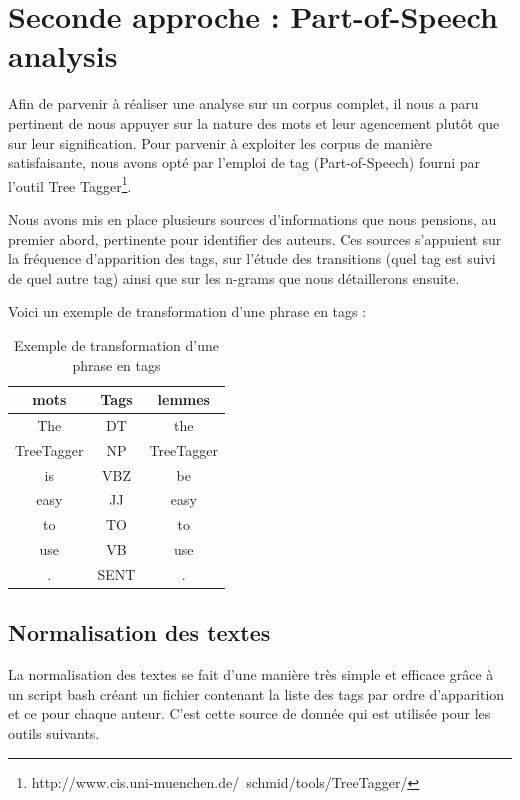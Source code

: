 \documentclass[a4paper,12pt]{report}
\begin{document}
\section{Seconde approche : Part-of-Speech analysis}

Afin de parvenir à réaliser une analyse sur un corpus complet, il nous a paru pertinent de nous appuyer sur la nature des mots et leur agencement plutôt que sur leur signification. Pour parvenir à exploiter les corpus de manière satisfaisante, nous avons opté par l'emploi de tag (Part-of-Speech) fourni par l'outil Tree Tagger\footnote{http://www.cis.uni-muenchen.de/~schmid/tools/TreeTagger/}.

Nous avons mis en place plusieurs sources d'informations que nous pensions, au premier abord, pertinente pour identifier des auteurs. Ces sources s’appuient sur la fréquence d'apparition des tags, sur l'étude des transitions (quel tag est suivi de quel autre tag) ainsi que sur les n-grams que nous détaillerons ensuite.

Voici un exemple de transformation d'une phrase en tags : 

\begin{table}[hbtp]
	\centering
		\begin{tabular}{|*{3}{c|}}
			\hline
			\textbf{mots} & \textbf{Tags} & \textbf{lemmes}\\
			\hline
			The & DT & the \\
			\hline
			TreeTagger & NP  & TreeTagger \\
			\hline
			is & VBZ  & be \\
			\hline
			easy & JJ & easy \\
			\hline
			 to & TO & to \\
			\hline
			use  & VB  & use \\
			\hline
			. & SENT & . \\
			\hline
		\end{tabular}
	\caption{Exemple de transformation d'une phrase en tags}
	\label{fig:TableauTag}
\end{table}


\subsection{Normalisation des textes}

La normalisation des textes se fait d'une manière très simple et efficace grâce à un script bash créant un fichier contenant la liste des tags par ordre d'apparition et ce pour chaque auteur. C'est cette source de donnée qui est utilisée pour les outils suivants. 
\end{document}
